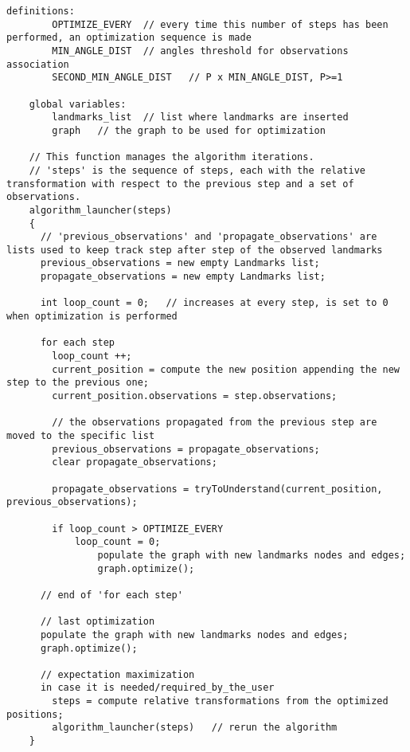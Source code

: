 {\footnotesize
  \lstset{language=C}
  \begin{lstlisting}[frame=shadowbox,breaklines]
    definitions:
    	OPTIMIZE_EVERY	// every time this number of steps has been performed, an optimization sequence is made
        MIN_ANGLE_DIST	// angles threshold for observations association
        SECOND_MIN_ANGLE_DIST	// P x MIN_ANGLE_DIST, P>=1
    
    global variables: 
    	landmarks_list	// list where landmarks are inserted
        graph	// the graph to be used for optimization
        
    // This function manages the algorithm iterations.
    // 'steps' is the sequence of steps, each with the relative transformation with respect to the previous step and a set of observations.
    algorithm_launcher(steps)
    {
      // 'previous_observations' and 'propagate_observations' are lists used to keep track step after step of the observed landmarks
      previous_observations = new empty Landmarks list;
      propagate_observations = new empty Landmarks list;
      
      int loop_count = 0;	// increases at every step, is set to 0 when optimization is performed
      
      for each step
        loop_count ++;
      	current_position = compute the new position appending the new step to the previous one;
        current_position.observations = step.observations;
        
        // the observations propagated from the previous step are moved to the specific list
        previous_observations = propagate_observations;
        clear propagate_observations;
        
        propagate_observations = tryToUnderstand(current_position, previous_observations);
        
        if loop_count > OPTIMIZE_EVERY
        	loop_count = 0;
                populate the graph with new landmarks nodes and edges;
                graph.optimize();
        
      // end of 'for each step'
      
      // last optimization
      populate the graph with new landmarks nodes and edges;
      graph.optimize();
      
      // expectation maximization
      in case it is needed/required_by_the_user
      	steps = compute relative transformations from the optimized positions;
        algorithm_launcher(steps)	// rerun the algorithm
    }
    

\end{lstlisting}}
